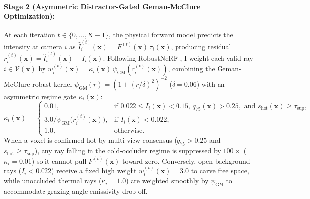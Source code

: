 \documentclass[12pt,letterpaper]{article}
\begin{document}
\paragraph{Stage 2 (Asymmetric Distractor-Gated Geman-McClure Optimization):}
At each iteration $t \in \{0, \dots, K-1\}$, the physical forward model predicts the intensity at camera $i$ as $\hat{I}_i^{(t)}(\mathbf{x}) = F^{(t)}(\mathbf{x})\, \tau_i(\mathbf{x})$, producing residual $r_i^{(t)}(\mathbf{x}) = \hat{I}_i^{(t)}(\mathbf{x}) - I_i(\mathbf{x})$. Following RobustNeRF \cite{sabour2023robustnerf}, I weight each valid ray $i \in \mathcal{V}(\mathbf{x})$ by $w_i^{(t)}(\mathbf{x}) = \kappa_i(\mathbf{x})\, \psi_{\text{GM}}(r_i^{(t)}(\mathbf{x}))$, combining the Geman-McClure robust kernel $\psi_{\text{GM}}(r) = (1 + (r/\delta)^2)^{-2}$ ($\delta = 0.06$) with an asymmetric regime gate $\kappa_i(\mathbf{x})$:
\begin{equation}
  \kappa_i(\mathbf{x}) =
  \begin{cases}
    0.01, & \text{if } 0.022 \le I_i(\mathbf{x}) < 0.15,\, q_{75}(\mathbf{x}) > 0.25, \text{ and } s_{\text{hot}}(\mathbf{x}) \ge \tau_{\text{sup}}, \\[2pt]
    3.0 / \psi_{\text{GM}}\!\big(r_i^{(t)}(\mathbf{x})\big), & \text{if } I_i(\mathbf{x}) < 0.022, \\[2pt]
    1.0, & \text{otherwise}.
  \end{cases}
  \label{eq:distractor_gate}
\end{equation}
When a voxel is confirmed hot by multi-view consensus ($q_{75} > 0.25$ and $s_{\text{hot}} \ge \tau_{\text{sup}}$), any ray falling in the cold-occluder regime is suppressed by $100\times$ ($\kappa_i = 0.01$) so it cannot pull $F^{(t)}(\mathbf{x})$ toward zero. Conversely, open-background rays ($I_i < 0.022$) receive a fixed high weight $w_i^{(t)}(\mathbf{x}) = 3.0$ to carve free space, while unoccluded thermal rays ($\kappa_i = 1.0$) are weighted smoothly by $\psi_{\text{GM}}$ to accommodate grazing-angle emissivity drop-off.
\end{document}
